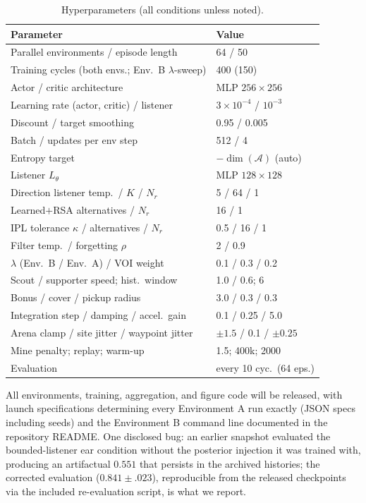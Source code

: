 \documentclass[sigconf,review,anonymous]{acmart}
\newcommand{\Ltheta}{L_\theta}
\begin{document}
\begin{table}[htbp]
\centering
\caption{Hyperparameters (all conditions unless noted).}
\label{tab:hyperparams}
\small
\setlength{\tabcolsep}{4pt}
\begin{tabular}{@{}>{\raggedright\arraybackslash}p{}l@{}}
\toprule
\textbf{Parameter} & \textbf{Value} \\
\midrule
Parallel environments / episode length & 64 / 50 \\
Training cycles (both envs.; Env.\ B $\lambda$-sweep) & 400 (150) \\
Actor / critic architecture & MLP $256\times256$ \\
Learning rate (actor, critic) / listener & $3{\times}10^{-4}$ / $10^{-3}$ \\
Discount / target smoothing & 0.95 / 0.005 \\
Batch / updates per env step & 512 / 4 \\
Entropy target & $-\dim(\mathcal{A})$ (auto) \\
Listener $\Ltheta$ & MLP $128\times128$ \\
Direction listener temp.\ / $K$ / $N_r$ & 5 / 64 / 1 \\
Learned$+$RSA alternatives / $N_r$ & 16 / 1 \\
IPL tolerance $\kappa$ / alternatives / $N_r$ & 0.5 / 16 / 1 \\
Filter temp.\ / forgetting $\rho$ & 2 / 0.9 \\
$\lambda$ (Env.\ B / Env.\ A) / VOI weight & 0.1 / 0.3 / 0.2 \\
Scout / supporter speed; hist.\ window & 1.0 / 0.6; 6 \\
Bonus / cover / pickup radius & 3.0 / 0.3 / 0.3 \\
Integration step / damping / accel.\ gain & 0.1 / 0.25 / 5.0 \\
Arena clamp / site jitter / waypoint jitter & $\pm1.5$ / 0.1 / $\pm0.25$ \\
Mine penalty; replay; warm-up & 1.5; 400k; 2000 \\
Evaluation & every 10 cyc.\ (64 eps.) \\
\bottomrule
\end{tabular}
\end{table}

All environments, training, aggregation, and figure code will be released, with launch specifications determining every Environment A run exactly (JSON specs including seeds) and the Environment B command line documented in the repository README. One disclosed bug: an earlier snapshot evaluated the bounded-listener ear condition without the posterior injection it was trained with, producing an artifactual $0.551$ that persists in the archived histories; the corrected evaluation ($0.841\pm.023$), reproducible from the released checkpoints via the included re-evaluation script, is what we report.
\end{document}
